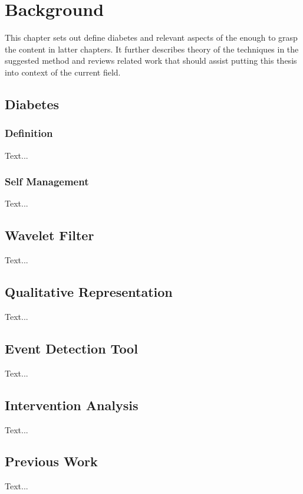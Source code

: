 \chapter{Background}

This chapter sets out define diabetes and relevant aspects of the enough to grasp the content in latter chapters. It further describes theory of the techniques in the suggested method and reviews related work that should assist putting this thesis into context of the current field.

\section{Diabetes}

\subsection{Definition}
Text...

\subsection{Self Management}
Text...

\section{Wavelet Filter}
Text...

\section{Qualitative Representation}
Text...

\section{Event Detection Tool}
Text...

\section{Intervention Analysis}
Text...

\section{Previous Work}
Text...
